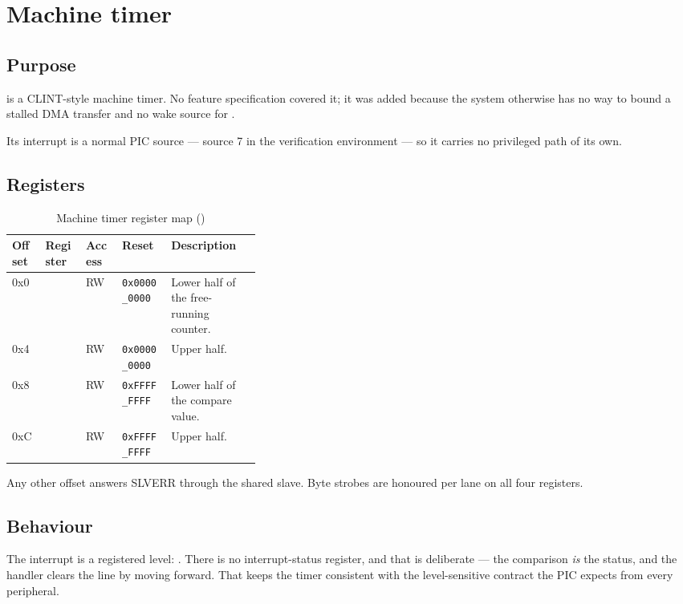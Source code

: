 \chapter{Machine timer}
\label{ch:mtimer}

\section{Purpose}

 is a CLINT-style machine timer. No feature specification
covered it; it was added because the system otherwise has no way to bound a
stalled DMA transfer and no wake source for .

Its interrupt is a normal PIC source --- source 7 in the verification environment
--- so it carries no privileged path of its own.

\section{Registers}

\begin{table}[H]
\centering
\caption{Machine timer register map ()}
\label{tab:tmrmap}
\begin{tabular}{@{}TlllL{0.36\linewidth}@{}}
\toprule
\textnormal{\textbf{Offset}} & \textbf{Register} & \textbf{Access} & \textbf{Reset} & \textbf{Description} \\
\midrule
0x0 &     & RW & \texttt{0x0000\_0000} & Lower half of the free-running counter. \\
0x4 &     & RW & \texttt{0x0000\_0000} & Upper half. \\
0x8 &  & RW & \texttt{0xFFFF\_FFFF} & Lower half of the compare value. \\
0xC &  & RW & \texttt{0xFFFF\_FFFF} & Upper half. \\
\bottomrule
\end{tabular}
\end{table}

Any other offset answers SLVERR through the shared slave. Byte strobes are
honoured per lane on all four registers.

\section{Behaviour}

The interrupt is a registered level: . There is no interrupt-status register, and that is deliberate ---
the comparison \emph{is} the status, and the handler clears the line by moving
 forward. That keeps the timer consistent with the level-sensitive
contract the PIC expects from every peripheral.


